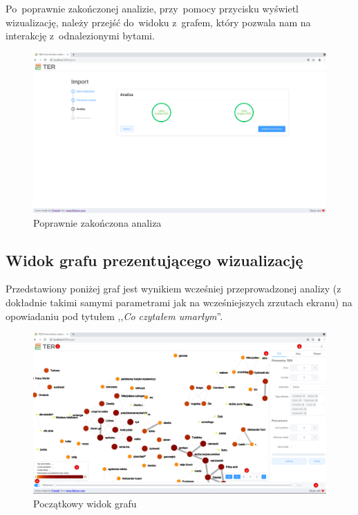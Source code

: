 \documentclass[12pt, a4paper]{article}
\begin{document}
Po~poprawnie zakończonej analizie, przy~pomocy przycisku wyświetl wizualizację, należy przejść do~widoku z~grafem, który pozwala nam na interakcję z~odnalezionymi bytami.

\begin{figure}[H]
  \centering
  \includegraphics[width=\linewidth]{images/analiza-success.png}
  \caption{Poprawnie zakończona analiza}
\end{figure}

\subsection{Widok grafu prezentującego wizualizację}\label{section:graph}

Przedstawiony poniżej graf jest wynikiem wcześniej przeprowadzonej analizy (z dokładnie takimi samymi parametrami jak na wcześniejszych zrzutach ekranu) na opowiadaniu pod tytułem ,,\textit{Co czytałem umarłym}''.

\begin{figure}[H]
  \centering
  \includegraphics[width=\linewidth]{images/graf-main.png}
  \caption{Początkowy widok grafu}
  \label{graf-main}
\end{figure}
\end{document}
